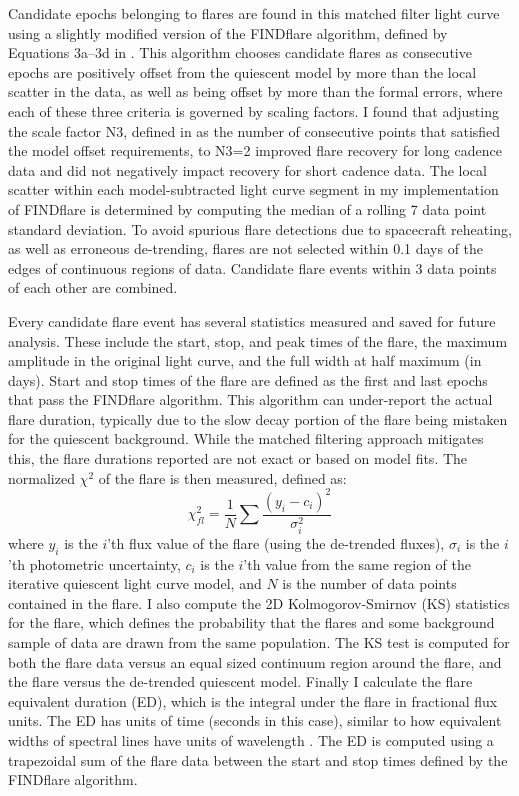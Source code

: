 \documentclass[twocolumn]{aastex6}
\begin{document}
Candidate epochs belonging to flares are found in this matched filter light curve using a slightly modified version of the FINDflare algorithm, defined by Equations 3a--3d in \citet{chang2015}. This algorithm chooses candidate flares as consecutive epochs are positively offset from the quiescent model by more than the local scatter in the data, as well as being offset by more than the formal errors, where each of these three criteria is governed by scaling factors.
I found that adjusting the scale factor N3, defined in \citet{chang2015} as the number of consecutive points that satisfied the model offset requirements, to N3=2 improved flare recovery for long cadence data and did not negatively impact recovery for short cadence data. The local scatter within each model-subtracted light curve segment in my implementation of FINDflare is determined by computing the median of a rolling 7 data point standard deviation.
To avoid spurious flare detections due to spacecraft reheating, as well as erroneous de-trending, flares are not selected within 0.1 days of the edges of continuous regions of data. Candidate flare events within 3 data points of each other are combined.


Every candidate flare event has several statistics measured and saved for future analysis. These include the start, stop, and peak times of the flare, the maximum amplitude in the original light curve, and the full width at half maximum (in days).
Start and stop times of the flare are defined as the first and last epochs that pass the FINDflare algorithm. This algorithm can under-report the actual flare duration, typically due to the slow decay portion of the flare being mistaken for the quiescent background. While the matched filtering approach mitigates this, the flare durations reported are not exact or based on model fits.
The normalized $\chi^2$ of the flare is then measured, defined as:
\begin{equation}
\chi^2_{fl} = \frac{1}{N}\sum\frac{(y_i - c_i)^2}{\sigma_i^2}
\label{eqn:chisq}
\end{equation}
where $y_i$ is the $i$'th flux value of the flare (using the de-trended fluxes), 
$\sigma_i$ is the $i$'th photometric uncertainty, 
$c_i$ is the $i$'th value from the same region of the iterative quiescent light curve model, 
and $N$ is the number of data points contained in the flare. 
I also compute the 2D Kolmogorov-Smirnov (KS) statistics for the flare, which defines the probability that the flares and some background sample of data are drawn from the same population. The KS test is computed for both the flare data versus an equal sized continuum region around the flare, and the flare versus the de-trended quiescent model. Finally I calculate the flare equivalent duration (ED), which is the integral under the flare in fractional flux units. The ED has units of time (seconds in this case), similar to how equivalent widths of spectral lines have units of wavelength \citep[e.g. see][]{huntwalker2012}. The ED is computed using a trapezoidal sum of the flare data between the start and stop times defined by the FINDflare algorithm.
\end{document}

